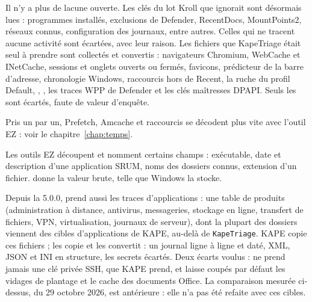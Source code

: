 \documentclass[11pt,a4paper,oneside]{report}
\begin{document}
\begin{description}[style=nextline,leftmargin=1em]
  \item[Couverture] Il n'y a plus de lacune ouverte. Les clés du lot Kroll que
        \wac{} ignorait sont désormais lues : programmes installés,
        exclusions de Defender, RecentDocs, MountPoints2, réseaux connus,
        configuration des journaux, entre autres. Celles qui ne tracent aucune
        activité sont écartées, avec leur raison.
        Les fichiers que KapeTriage était seul à prendre sont collectés et
        convertis : navigateurs Chromium, WebCache et INetCache, sessions et
        onglets ouverts ou fermés, favicons, prédicteur de la barre d'adresse,
        chronologie Windows, raccourcis hors
        de Recent, la ruche du profil Default, ,
        , les traces WPP de Defender et les clés maîtresses
        DPAPI. Seuls les  sont écartés, faute de valeur
        d'enquête.
  \item[Vitesse sur les petits artefacts] Pris un par un, Prefetch, Amcache et
        raccourcis se décodent plus vite avec l'outil EZ : voir le
        chapitre~\ref{chap:temps}.
  \item[Interprétations prêtes à lire] Les outils EZ découpent et nomment certains
        champs : exécutable, date et description d'une application SRUM, noms des
        dossiers connus, extension d'un fichier. \wac{} donne la valeur brute,
        telle que Windows la stocke.
\end{description}

\begin{attention}
Depuis la 5.0.0, \wac{} prend aussi les traces d'applications : une table de
produits (administration à distance, antivirus, messageries, stockage en
ligne, transfert de fichiers, VPN, virtualisation, journaux de serveur), dont
la plupart des dossiers viennent des cibles d'applications de KAPE, au-delà de
\texttt{KapeTriage}. KAPE copie ces fichiers ; \wac{} les copie et les
convertit : un journal ligne à ligne et daté, XML, JSON et INI en structure,
les secrets écartés. Deux écarts voulus : \wac{} ne prend jamais une clé
privée SSH, que KAPE prend, et laisse coupés par défaut les vidages de
plantage et le cache des documents Office. La comparaison mesurée ci-dessus,
du 29 octobre 2026, est antérieure : elle n'a pas été refaite avec ces cibles.
\end{attention}

\end{document}
